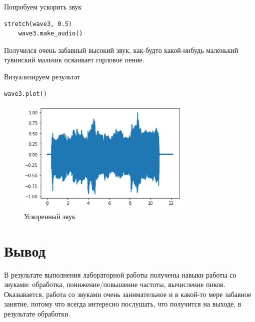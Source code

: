 \documentclass[a4paper,12pt]{article}
\begin{document}
\begin{enumerate}
Попробуем ускорить звук
\begin{lstlisting}[caption=Ускоренние звука]
	stretch(wave3, 0.5)
	wave3.make_audio()
\end{lstlisting}

Получился очень забавный высокий звук, как-будто какой-нибудь маленький тувинский мальчик осваивает горловое пение.

Визуализируем результат
\begin{lstlisting}[caption=Визуализация ускоренного звука]
	wave3.plot()
\end{lstlisting}
\begin{figure}[H]
	\centering
	\includegraphics[width=0.75\textwidth]{4_2.png}
	\caption{Ускоренный звук}
	\label{fig:4.2}
\end{figure}

\end{enumerate}

\section{Вывод}

В результате выполнения лабораторной работы получены навыки работы со звуками: обработка, понижение/повышение частоты, вычисление пиков. Оказывается, работа со звуками очень занимательное и в какой-то мере забавное занятие, потому что всегда интересно послушать, что получится на выходе, в результате обработки.
\end{document}
